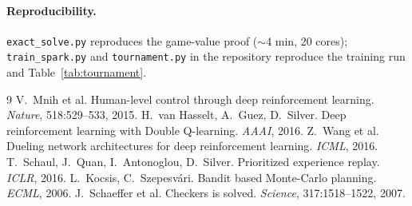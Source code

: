 \documentclass[10pt,twocolumn]{article}
\begin{document}
\paragraph{Reproducibility.} \texttt{exact\_solve.py} reproduces the
game-value proof ($\sim$4 min, 20 cores); \texttt{train\_spark.py} and
\texttt{tournament.py} in the repository reproduce the training run and
Table~\ref{tab:tournament}.

\begin{thebibliography}{9}\scriptsize
\setlength{\itemsep}{0pt}\setlength{\parsep}{0pt}\setlength{\topsep}{1pt}
 V.~Mnih et al. Human-level control through deep
reinforcement learning. \emph{Nature}, 518:529--533, 2015.
 H.~van Hasselt, A.~Guez, D.~Silver. Deep
reinforcement learning with Double Q-learning. \emph{AAAI}, 2016.
 Z.~Wang et al. Dueling network architectures for deep
reinforcement learning. \emph{ICML}, 2016.
 T.~Schaul, J.~Quan, I.~Antonoglou, D.~Silver.
Prioritized experience replay. \emph{ICLR}, 2016.
 L.~Kocsis, C.~Szepesv\'ari. Bandit based Monte-Carlo
planning. \emph{ECML}, 2006.
 J.~Schaeffer et al. Checkers is solved.
\emph{Science}, 317:1518--1522, 2007.
\end{thebibliography}
\end{document}
